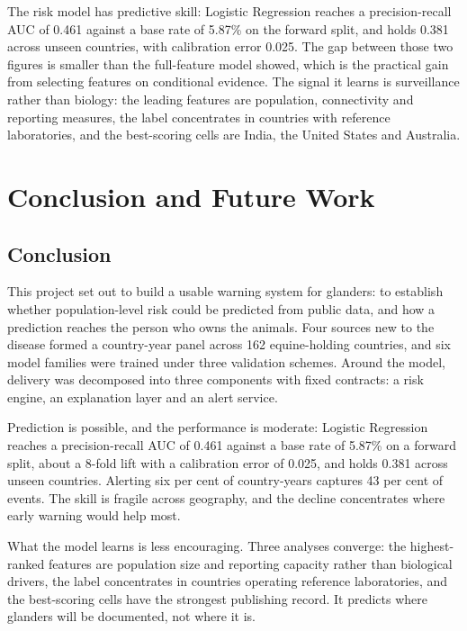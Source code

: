 \documentclass[10pt,openany]{report}
\begin{document}
The risk model has predictive skill: Logistic Regression reaches a precision-recall AUC of 0.461 against a base
rate of 5.87\% on the forward split, and holds 0.381 across unseen countries, with
calibration error 0.025. The gap between those two figures is smaller than the full-feature model
showed, which is the practical gain from selecting features on conditional evidence. The signal it
learns is surveillance rather than biology: the leading features are population, connectivity and
reporting measures, the label concentrates in countries with reference laboratories, and the
best-scoring cells are India, the United States and Australia.

\chapter{Conclusion and Future Work}
\label{ch:concl}

\section{Conclusion}

This project set out to build a usable warning system for glanders: to establish whether
population-level risk could be predicted from public data, and how a prediction reaches the person who
owns the animals. Four sources new to the disease formed a country-year panel across 162
equine-holding countries, and six model families were trained under three validation schemes. Around the model, delivery was decomposed into three components with fixed contracts: a risk
engine, an explanation layer and an alert service.

Prediction is possible, and the performance is moderate: Logistic Regression reaches a precision-recall AUC of
0.461 against a base rate of 5.87\% on a forward split, about a 8-fold lift with a
calibration error of 0.025, and holds 0.381 across unseen countries. Alerting six per cent of
country-years captures 43 per cent of events. The skill is fragile across geography, and the
decline concentrates where early warning would help most.

What the model learns is less encouraging. Three analyses converge: the highest-ranked features are
population size and reporting capacity rather than biological drivers, the label concentrates in
countries operating reference laboratories, and the best-scoring cells have the strongest publishing
record. It predicts where glanders will be documented, not where it is.
\end{document}
